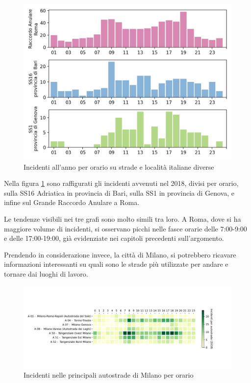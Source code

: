 \documentclass[a4paper,12pt]{report}
\begin{document}
\begin{figure}
    \includegraphics[width=\linewidth]{../src/incidenti/incidenti_aci/orari/orari.png}
    \caption{Incidenti all'anno per orario su strade e località italiane diverse}
    \label{fig:orari-strade-aci}
\end{figure}

Nella figura \ref{fig:orari-strade-aci} sono raffigurati gli incidenti avvenuti 
nel 2018, divisi per orario, sulla SS16 Adriatica in provincia di Bari, sulla SS1 
in provincia di Genova, e infine sul Grande Raccordo Anulare a Roma.

Le tendenze visibili nei tre grafi sono molto simili tra loro. 
A Roma, dove si ha maggiore 
volume di incidenti, si osservano picchi nelle fasce orarie delle 
7:00-9:00 e delle 17:00-19:00, già evidenziate nei capitoli precedenti sull'argomento. 

Prendendo in considerazione invece, la città di Milano, si potrebbero ricavare 
informazioni interessanti su quali sono le strade più utilizzate per 
andare e tornare dai luoghi di lavoro.

\begin{figure}
    \includegraphics[width=\linewidth]{../src/incidenti/incidenti_aci/orari/tangenziali_autostrade.png}
    \caption{Incidenti nelle principali autostrade di Milano per orario}
    \label{fig:tangenziali-autostrade}
\end{figure}
\end{document}
